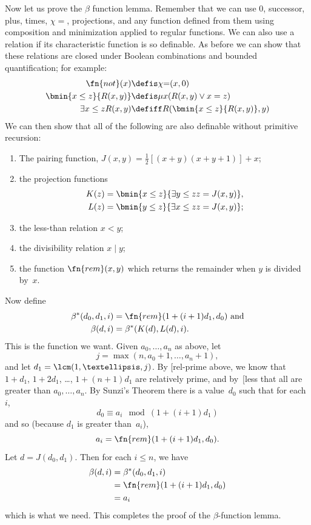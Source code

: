 \documentclass[10pt,a4paper]{article}
\makeatletter
\theoremstyle{plain}
\theoremstyle{definition}
\theoremstyle{remark}
\newcommand{\olref}{\@ifnextchar[{\olref@i}{\olref@final}}
\def\olref@i[#1]{\@ifnextchar[{\olref@ii}{\olref@final}}
\def\olref@ii[#1]{\@ifnextchar[{\olref@iii}{\olref@final}}
\def\olref@iii[#1]{\olref@final}
\def\olref@final#1{\ref{#1}}
\providecommand{\lif}{\mathbin{\rightarrow}}
\providecommand{\Char}{\chi}
\providecommand{\bforall}{\forall}
\providecommand{\bexists}{\exists}
\providecommand{\umin}{\mu}
\makeatother
\begin{document}
Now let us prove the $\beta$ function lemma. Remember that we can use
$0$, successor, plus, times, $\Char{=}$, projections, and any function
defined from them using composition and minimization applied to
regular functions. We can also use a relation if its characteristic
function is so definable. As before we can show that these relations
are closed under Boolean combinations and bounded quantification; for
example:
\begin{align*}
\fn{not}(x) & \defis \Char{=}(x,0)\\
\bmin{x \leq z}{R(x,y)} & \defis \umin{x}{(R(x,y) \lor x = z)}\\
\bexists{x \leq z}{R(x,y)} & \defiff R(\bmin{x \leq z}{R(x,y)}, y)
\end{align*}
We can then show that all of the following are also definable without
primitive recursion:
\begin{enumerate}
\item The pairing function, $J(x,y) = \frac{1}{2}[(x+y)(x+y+1)] + x$;
\item the projection functions
\begin{align*}
K(z) & = \bmin{x \leq z}{\bexists{y \leq z}{z = J(x,y)}},\\
L(z) & = \bmin{y \leq z}{\bexists{x \leq z}{z = J(x,y)}};
\end{align*}
\item the less-than relation $x < y$;
\item the divisibility relation $x \mid y$;
\item the function $\fn{rem}(x,y)$ which returns the remainder when
  $y$ is divided by~$x$.
\end{enumerate}
Now define
\begin{align*}
\beta^*(d_0,d_1,i) & = \fn{rem}(1+(i+1) d_1,d_0) \text{ and}\\
\beta(d,i) & = \beta^*(K(d),L(d),i).
\end{align*}
This is the function we want. Given $a_0,\dots,a_n$ as above, let
\[
j = \max(n,a_0+1,\dots,a_n+1),
\]
and let $d_1 = \lcm(1,\dots,j)$. By \olref{rel-prime} above,
we know that $1+d_1$, $1+2 d_1$, \dots, $1+(n+1) d_1$ are relatively
prime, and by~\olref{less} that all are greater than $a_0,\dots,a_n$.
By Sunzi's Theorem there is a value~$d_0$ such that for each~$i$,
\[
d_0 \equiv a_i \mod (1+(i+1)d_1)
\]
and so (because $d_1$ is greater than~$a_i$),
\[
a_i = \fn{rem}(1+(i+1)d_1,d_0).
\]
Let $d = J(d_0,d_1)$. Then for each $i \le n$, we have
\begin{align*}
\beta(d,i) & =  \beta^*(d_0,d_1,i) \\
& =  \fn{rem}(1+(i+1) d_1,d_0) \\
& =  a_i
\end{align*}
which is what we need. This completes the proof of the
$\beta$-function lemma.
\end{document}
